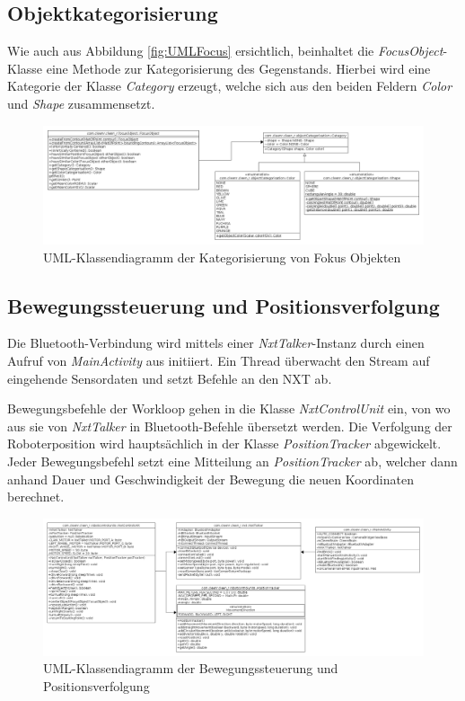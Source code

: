 \subsection{Objektkategorisierung}

Wie auch aus Abbildung \ref{fig:UMLFocus} ersichtlich, beinhaltet die \textit{FocusObject}-Klasse eine Methode zur Kategorisierung des Gegenstands. Hierbei wird eine Kategorie der Klasse \textit{Category} erzeugt, welche sich aus den beiden Feldern \textit{Color} und \textit{Shape} zusammensetzt.

\begin{figure}[h]
\centering
\includegraphics[width=\textwidth]{Bilder/Software/UML/Categories}
\caption{UML-Klassendiagramm der Kategorisierung von Fokus Objekten}
\label{fig:UMLCategorisation}
\end{figure}

\subsection{Bewegungssteuerung und Positionsverfolgung}

Die Bluetooth-Verbindung wird mittels einer \textit{NxtTalker}-Instanz durch einen Aufruf von \textit{MainActivity} aus initiiert. Ein Thread überwacht den Stream auf eingehende Sensordaten und setzt Befehle an den NXT ab.

Bewegungsbefehle der Workloop gehen in die Klasse \textit{NxtControlUnit} ein, von wo aus sie von \textit{NxtTalker} in Bluetooth-Befehle übersetzt werden. Die Verfolgung der Roboterposition wird hauptsächlich in der Klasse \textit{PositionTracker} abgewickelt. Jeder Bewegungsbefehl setzt eine Mitteilung an \textit{PositionTracker} ab, welcher dann anhand Dauer und Geschwindigkeit der Bewegung die neuen Koordinaten berechnet.

\begin{figure}[h]
\centering
\includegraphics[width=\textwidth]{Bilder/Software/UML/Movement}
\caption{UML-Klassendiagramm der Bewegungssteuerung und Positionsverfolgung}
\label{fig:UMLMovement}
\end{figure}

